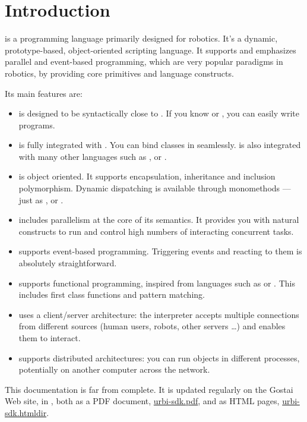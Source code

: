 \chapter*{Introduction}

\us is a programming language primarily designed for robotics. It's a
dynamic, prototype-based, object-oriented scripting language. It
supports and emphasizes parallel and event-based programming, which
are very popular paradigms in robotics, by providing core primitives
and language constructs.

Its main features are:
\begin{itemize}
\item \us is designed to be syntactically close to \Cxx. If you know
  \C or \Cxx, you can easily write \us programs.
\item \us is fully integrated with \Cxx. You can bind \Cxx classes
  in \us seamlessly. \us is also integrated with many other
  languages such as \java, \matlab or \python.
\item \us is object oriented. It supports encapsulation, inheritance
  and inclusion polymorphism. Dynamic dispatching is available through
  monomethods --- just as \Cxx, \Cs or \java.
\item \us includes parallelism at the core of its semantics. It
  provides you with natural constructs to run and control high numbers
  of interacting concurrent tasks.
\item \us supports event-based programming. Triggering events and
  reacting to them is absolutely straightforward.
\item \us supports functional programming, inspired from languages
  such as \lisp or \caml. This includes first class functions and
  pattern matching.
\item \us uses a client/server architecture: the interpreter accepts
  multiple connections from different sources (human users, robots,
  other servers \ldots) and enables them to interact.
\item \us supports distributed architectures: you can run objects in
  different processes, potentially on another computer across the
  network.
\end{itemize}

This documentation is far from complete.  It is updated regularly on
the Gostai Web site, in \href{\docurl}{\docurl}, both as a PDF
document, \href{\docurl/urbi-sdk.pdf}{urbi-sdk.pdf}, and as HTML
pages, \href{\docurl/urbi-sdk.htmldir}{urbi-sdk.htmldir}.


